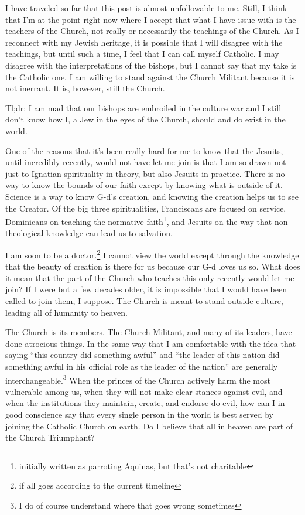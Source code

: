 \documentclass[12pt]{article}
\newcommand{\say}[1]{``#1''}
\renewcommand{\,}{\textsuperscript{,}}
\begin{document}
I have traveled so far that this post is almost unfollowable to me.  
Still, I think that I'm at the point right now where I accept that what I have issue with is the teachers of the Church, not really or necessarily the teachings of the Church.  
As I reconnect with my Jewish heritage, it is possible that I will disagree with the teachings, but until such a time, I feel that I can call myself Catholic.  
I may disagree with the interpretations of the bishops, but I cannot say that my take is the Catholic one.  
I am willing to stand against the Church Militant because it is not inerrant.  
It is, however, still the Church.

Tl;dr: I am mad that our bishops are embroiled in the culture war and I still don't know how I, a Jew in the eyes of the Church, should and do exist in the world.

One of the reasons that it's been really hard for me to know that the Jesuits, until incredibly recently, would not have let me join is that I am so drawn not just to Ignatian spirituality in theory, but also Jesuits in practice.  
There is no way to know the bounds of our faith except by knowing what is outside of it.  
Science is a way to know G-d's creation, and knowing the creation helps us to see the Creator.  
Of the big three spiritualities, Franciscans are focused on service, Dominicans on teaching the normative faith\footnote{initially written as parroting Aquinas, but that's not charitable}, and Jesuits on the way that non-theological knowledge can lead us to salvation.

I am soon to be a doctor.\footnote{if all goes according to the current timeline}  
I cannot view the world except through the knowledge that the beauty of creation is there for us because our G-d loves us so.  
What does it mean that the part of the Church who teaches this only recently would let me join?  
If I were but a few decades older, it is impossible that I would have been called to join them, I suppose.  
The Church is meant to stand outside culture, leading all of humanity to heaven.

The Church is its members.  
The Church Militant, and many of its leaders, have done atrocious things.  
In the same way that I am comfortable with the idea that saying \say{this country did something awful} and \say{the leader of this nation did something awful in his official role as the leader of the nation} are generally interchangeable.\footnote{I do of course understand where that goes wrong sometimes}  
When the princes of the Church actively harm the most vulnerable among us, when they will not make clear stances against evil, and when the institutions they maintain, create, and endorse do evil, how can I in good conscience say that every single person in the world is best served by joining the Catholic Church on earth.  
Do I believe that all in heaven are part of the Church Triumphant?
\end{document}
